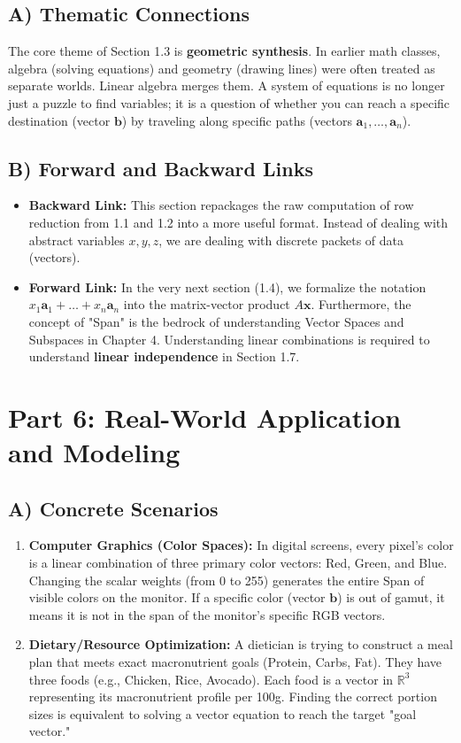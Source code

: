 \documentclass[11pt]{article}
\begin{document}
\subsection{A) Thematic Connections}
The core theme of Section 1.3 is \textbf{geometric synthesis}. In earlier math classes, algebra (solving equations) and geometry (drawing lines) were often treated as separate worlds. Linear algebra merges them. A system of equations is no longer just a puzzle to find variables; it is a question of whether you can reach a specific destination (vector $\mathbf{b}$) by traveling along specific paths (vectors $\mathbf{a}_1, \dots, \mathbf{a}_n$).

\subsection{B) Forward and Backward Links}
\begin{itemize}
    \item \textbf{Backward Link:} This section repackages the raw computation of row reduction from 1.1 and 1.2 into a more useful format. Instead of dealing with abstract variables $x, y, z$, we are dealing with discrete packets of data (vectors).
    \item \textbf{Forward Link:} In the very next section (1.4), we formalize the notation $x_1\mathbf{a}_1 + \dots + x_n\mathbf{a}_n$ into the matrix-vector product $A\mathbf{x}$. Furthermore, the concept of "Span" is the bedrock of understanding Vector Spaces and Subspaces in Chapter 4. Understanding linear combinations is required to understand \textbf{linear independence} in Section 1.7.
\end{itemize}

\newpage
\section{Part 6: Real-World Application and Modeling}

\subsection{A) Concrete Scenarios}
\begin{enumerate}
    \item \textbf{Computer Graphics (Color Spaces):} In digital screens, every pixel's color is a linear combination of three primary color vectors: Red, Green, and Blue. Changing the scalar weights (from 0 to 255) generates the entire Span of visible colors on the monitor. If a specific color (vector $\mathbf{b}$) is out of gamut, it means it is not in the span of the monitor's specific RGB vectors.
    \item \textbf{Dietary/Resource Optimization:} A dietician is trying to construct a meal plan that meets exact macronutrient goals (Protein, Carbs, Fat). They have three foods (e.g., Chicken, Rice, Avocado). Each food is a vector in $\mathbb{R}^3$ representing its macronutrient profile per 100g. Finding the correct portion sizes is equivalent to solving a vector equation to reach the target "goal vector."
\end{enumerate}
\end{document}
